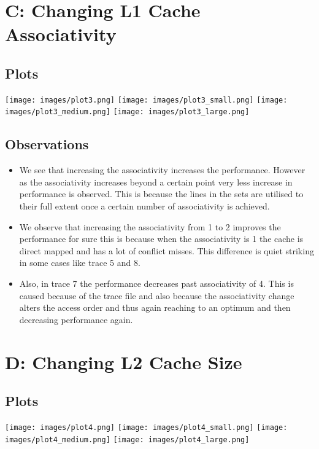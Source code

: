 \documentclass[11pt]{scrartcl}
\begin{document}
\newpage
\section{C: Changing L1 Cache Associativity}
\subsection{Plots}

\texttt{[image: images/plot3.png]}
\texttt{[image: images/plot3\_small.png]}
\texttt{[image: images/plot3\_medium.png]}
\texttt{[image: images/plot3\_large.png]}


\subsection{Observations}
\begin{itemize}
    \item We see that increasing the associativity increases the performance. However as the associativity increases beyond a certain point very less increase in performance is observed. This is because the lines in the sets are utilised to their full extent once a certain number of associativity is achieved.
    \item We observe that increasing the associativity from 1 to 2 improves the performance for sure this is because when the associativity is 1 the cache is direct mapped and has a lot of conflict misses. This difference is quiet striking in some cases like trace 5 and 8.
    \item Also, in trace 7 the performance decreases past associativity of 4. This is caused because of the trace file and also because the associativity change alters the access order and thus again reaching to an optimum and then decreasing performance again.
\end{itemize}

\newpage

\section{D: Changing L2 Cache Size}
\subsection{Plots}

\texttt{[image: images/plot4.png]}
\texttt{[image: images/plot4\_small.png]}
\texttt{[image: images/plot4\_medium.png]}
\texttt{[image: images/plot4\_large.png]}
\end{document}
